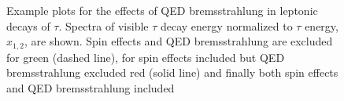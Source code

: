 \documentclass{article}
\begin{document}
\begin{figure}[h!]
\centering 
{}
 \caption{\label{Fig:QED} Example  plots for the effects of QED bremsstrahlung
in leptonic decays of  $\tau$.
 Spectra of visible $\tau$ decay  energy  normalized to $\tau$ energy, $x_{1,2}$, are 
shown. 
Spin effects and QED bremsstrahlung are excluded  for green (dashed line), for  
spin effects included but QED bremsstrahlung excluded red (solid line) and 
finally both spin effects  and  QED bremsstrahlung included 
}
\end{figure}
\end{document}
